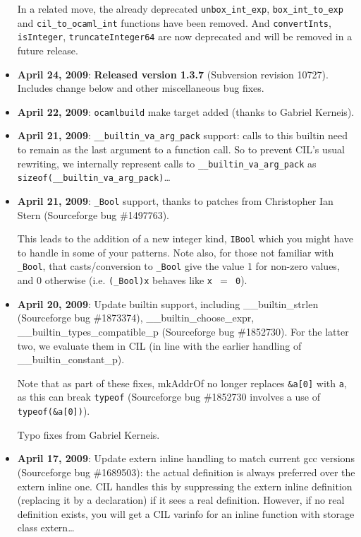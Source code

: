 \documentclass[letterpaper]{article}
\def\t#1{{\tt #1}}
\begin{document}
\begin{itemize}
  In a related move, the already deprecated \t{unbox\_int\_exp},
  \t{box\_int\_to\_exp} and \t{cil\_to\_ocaml\_int} functions have
  been removed.  And \t{convertInts}, \t{isInteger},
  \t{truncateInteger64} are now deprecated and will be removed in a
  future release.

\item {\bf April 24, 2009}: {\bf Released version 1.3.7} (Subversion
  revision 10727). Includes change below and other miscellaneous bug fixes.
\item {\bf April 22, 2009}: \t{ocamlbuild} make target added (thanks
  to Gabriel Kerneis).
\item {\bf April 21, 2009}: \t{\_\_builtin\_va\_arg\_pack} support:
  calls to this builtin need to remain as the last argument to a
  function call. So to prevent CIL's usual rewriting, we internally
  represent calls to \t{\_\_builtin\_va\_arg\_pack} as
  \t{sizeof(\_\_builtin\_va\_arg\_pack)}\ldots
  
\item {\bf April 21, 2009}: \t{\_Bool} support, thanks to patches
  from Christopher Ian Stern (Sourceforge bug \#1497763).

  This leads to the addition of a new integer kind, \t{IBool} 
  which you might have to handle in some of your patterns. Note also, for
  those not familiar with \t{\_Bool}, that casts/conversion to \t{\_Bool}
  give the value 1 for non-zero values, and 0 otherwise (i.e. 
  \t{(\_Bool)x} behaves like \t{x $\!=$ 0}).
  
\item {\bf April 20, 2009}: Update builtin support, including
  \_\_builtin\_strlen (Sourceforge bug \#1873374), \_\_builtin\_choose\_expr,
  \_\_builtin\_types\_compatible\_p (Sourceforge bug \#1852730).
  For the latter two, we evaluate them in CIL (in line with the earlier handling
  of \_\_builtin\_constant\_p).

  Note that as part of these fixes, mkAddrOf no longer replaces
  \t{\&a[0]} with \t{a}, as this can break \t{typeof} (Sourceforge bug
  \#1852730 involves a use of \t{typeof(\&a[0])}).

  Typo fixes from Gabriel Kerneis.
  
\item {\bf April 17, 2009}: Update extern inline handling to match
  current gcc versions (Sourceforge bug \#1689503): the actual
  definition is always preferred over the extern inline one. CIL
  handles this by suppressing the extern inline definition (replacing
  it by a declaration) if it sees a real definition. However, if no
  real definition exists, you will get a CIL varinfo for an inline
  function with storage class extern\ldots


\end{itemize}
\end{document}
